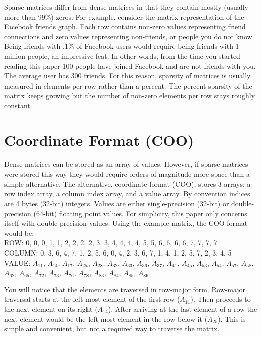 \par Sparse matrices differ from dense matrices in that they contain mostly (usually more than 99\%) zeros. For example, consider the matrix representation of the Facebook friends graph. Each row contains non-zero values representing friend connections and zero values representing non-friends, or people you do not know. Being friends with .1\% of Facebook users would require being friends with 1 million people, an impressive feat. In other words, from the time you started reading this paper 100 people have joined Facebook and are not friends with you. The average user has 300 friends. For this reason, sparsity of matrices is usually measured in elements per row rather than a percent. The percent sparsity of the matrix keeps growing but the number of non-zero elements per row stays roughly constant.
\section{Coordinate Format (COO)}
\par Dense matrices can be stored as an array of values. However, if sparse matrices were stored this way they would require orders of magnitude more space than a simple alternative. The alternative, coordinate format (COO), stores 3 arrays: a row index array, a column index array, and a value array. By convention indices are 4 bytes (32-bit) integers. Values are either single-precision (32-bit) or double-precision (64-bit) floating point values. For simplicity, this paper only concerns itself with double precision values. Using the example matrix, the COO format would be:\\
ROW:    0, 0, 0, 1, 1, 2, 2, 2, 2, 3, 3, 4, 4, 4, 4, 5, 5, 6, 6, 6, 6, 7, 7, 7, 7 \\ 
COLUMN: 0, 3, 6, 4, 7, 1, 2, 5, 6, 0, 4, 2, 3, 6, 7, 1, 4, 1, 2, 5, 7, 2, 3, 4, 5\\ 
VALUE: $A_{11}$, $A_{14}$, $A_{17}$, $A_{25}$, $A_{28}$, $A_{32}$, $A_{33}$, $A_{36}$, $A_{37}$, $A_{41}$, $A_{45}$, $A_{53}$, $A_{54}$, $A_{57}$, $A_{58}$, $A_{62}$, $A_{65}$, $A_{72}$, $A_{73}$, $A_{76}$, $A_{78}$, $A_{83}$, $A_{84}$, $A_{85}$, $A_{86}$ \par
You will notice that the elements are traversed in row-major form. Row-major traversal starts at the left most element of the first row ($A_{11}$). Then proceeds to the next element on its right ($A_{14}$). After arriving at the last element of a row the next element would be the left most element in the row below it ($A_{25}$). This is simple and convenient, but not a required way to traverse the matrix. 
